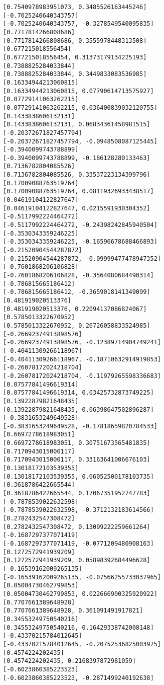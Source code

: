 \documentclass[11pt]{article}
\begin{document}
\begin{Verbatim}[commandchars=\\\{\}]
[0.7540978983951073, 0.3485526163445246]
[-0.7025240640343757]
[-0.7025240640343757, -0.3278549540095835]
[0.7717814266808686]
[0.7717814266808686, 0.3555978448313508]
[0.677215018556454]
[0.677215018556454, 0.31373179134225193]
[0.7388825284033844]
[0.7388825284033844, 0.3449833083536985]
[0.16334944213060815]
[0.16334944213060815, 0.07790614713575927]
[0.07729141063262215]
[0.07729141063262215, 0.036400839032120755]
[0.1433838606132131]
[0.1433838606132131, 0.06834361458981515]
[-0.20372671827457794]
[-0.20372671827457794, -0.0948508087125445]
[-0.3940099743788899]
[-0.3940099743788899, -0.186128280133463]
[0.7136782804085526]
[0.7136782804085526, 0.33537223134399796]
[0.17009088763519764]
[0.17009088763519764, 0.08119326933438517]
[0.04619104122827647]
[0.04619104122827647, 0.0215591930304352]
[-0.5117992224464272]
[-0.5117992224464272, -0.24398242845940504]
[-0.3530343359246225]
[-0.3530343359246225, -0.16596678688466893]
[-0.21520904544287872]
[-0.21520904544287872, -0.09999477478947352]
[-0.7601868206106828]
[-0.7601868206106828, -0.3564080684490314]
[-0.786815665186412]
[-0.786815665186412, -0.3659018141349099]
[0.481919020513376]
[0.481919020513376, 0.22094137086824067]
[0.5785013322670952]
[0.5785013322670952, 0.26726058833524985]
[-0.26692374913898576]
[-0.26692374913898576, -0.12389714904749241]
[-0.40411309266118967]
[-0.40411309266118967, -0.18710632914919853]
[-0.26078172024218704]
[-0.26078172024218704, -0.11979265598336683]
[0.07577841496619314]
[0.07577841496619314, 0.03425732873749225]
[0.13922879821648435]
[0.13922879821648435, 0.06398647502896287]
[-0.3831653249649528]
[-0.3831653249649528, -0.17818659820784533]
[0.6697278618983051]
[0.6697278618983051, 0.30751673565481835]
[0.7170943015000117]
[0.7170943015000117, 0.33163641006676103]
[0.13018172103539355]
[0.13018172103539355, 0.06052500178103735]
[0.3618786422665544]
[0.3618786422665544, 0.17067351952747783]
[-0.7878539022632598]
[-0.7878539022632598, -0.3712132183614566]
[0.2782432547308472]
[0.2782432547308472, 0.13099222259661264]
[-0.1687297377071419]
[-0.1687297377071419, -0.0771209480908163]
[0.1272572941939209]
[0.1272572941939209, 0.05898392684496628]
[-0.16539162009265135]
[-0.16539162009265135, -0.07566255733037965]
[0.05004730462799853]
[0.05004730462799853, 0.022666900325920922]
[0.7707661389648928]
[0.7707661389648928, 0.361091491917821]
[0.34553249750540216]
[0.34553249750540216, 0.16429338742008148]
[-0.43370215784012645]
[-0.43370215784012645, -0.20752536825003975]
[0.4574224202435]
[0.4574224202435, 0.2168397872981059]
[-0.6023860385223523]
[-0.6023860385223523, -0.2871499240192638]

\end{Verbatim}
\end{document}
